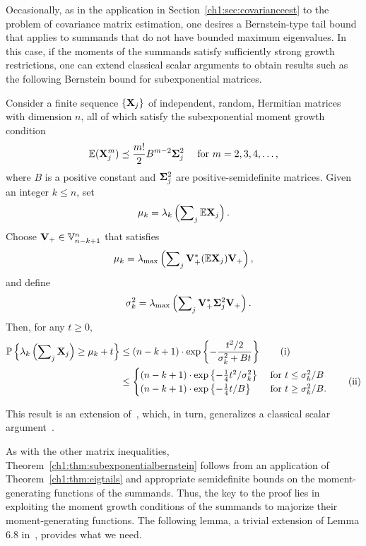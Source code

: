 Occasionally, as in the application in Section~\ref{ch1:sec:covarianceest} to the
problem of covariance matrix estimation, one desires a Bernstein-type tail bound
that applies to summands that do not have bounded maximum eigenvalues. In this
case, if the moments of the summands satisfy sufficiently strong growth
restrictions, one can extend classical scalar arguments to obtain results such
as the following Bernstein bound for subexponential matrices. 

\begin{thm}
Consider a finite sequence $\{\mathbf{X}_j\}$ of independent, random, Hermitian
matrices with dimension $n$, all of which satisfy the subexponential moment
growth condition
\[
\mathbb{E} (\mathbf{X}_j^m) \preceq \frac{m!}{2} B^{m-2} \mathbf{\Sigma}_j^2 \quad \text{ for
} m=2,3,4,\ldots,
\]
where $B$ is a positive constant and $\mathbf{\Sigma}_j^2$ are
positive-semidefinite matrices. Given an integer $k \leq n$, set
\[
\mu_k = \lambda_k \left( \sum\nolimits_j \mathbb{E} \mathbf{X}_j \right).
\]
Choose $\mathbf{V}_+ \in \mathbb{V}_{n-k+1}^{n}$ that satisfies
\[
\mu_k = \lambda_{\mathrm{max}}\left( \sum\nolimits_j \mathbf{V}_+^* (\mathbb{E} \mathbf{X}_j) \mathbf{V}_+ \right),
\]
and define
\[
 \quad \sigma_k^2 = \lambda_{\mathrm{max}}\left( \sum\nolimits_j \mathbf{V}_+^* \mathbf{\Sigma}_j^2
\mathbf{V}_+ \right).
\] 
Then, for any $t \geq 0,$
\begin{align}
\mathbb{P}\left\{\lambda_k \left( \sum\nolimits_j \mathbf{X}_j \right) \geq \mu_k + t \right\} & \leq
(n-k+1) \cdot \mathrm{exp}\left\{ - \frac{t^2/2}{\sigma_k^2 + B t}\right\} \tag{i}
\label{ch1:eqn:subexponentialbernstein} \\
 & \leq \begin{cases}
         (n-k+1) \cdot \mathrm{exp}\left\{ -\tfrac{1}{4} t^2/\sigma_k^2\right\} & \text{
for } t \leq \sigma_k^2/B \\
	 (n-k+1) \cdot \mathrm{exp}\left\{ -\tfrac{1}{4} t/B\right\} & \text{ for } t
\geq \sigma_k^2/B.
        \end{cases} \tag{ii} \label{ch1:eqn:splitsubexponentialbernstein}
\end{align}
\label{ch1:thm:subexponentialbernstein}
\end{thm}
 
This result is an extension of~\cite[Theorem 6.2]{T10a}, which, in turn,
generalizes a classical scalar argument~\cite{DG99}.

As with the other matrix inequalities, Theorem~\ref{ch1:thm:subexponentialbernstein}
follows from an application of Theorem~\ref{ch1:thm:eigtails} and appropriate
semidefinite bounds on the moment-generating functions of the summands. Thus,
the key to the proof lies in exploiting the moment growth conditions of the
summands to majorize their moment-generating functions. The following lemma, a
trivial extension of Lemma 6.8 in~\cite{T10a}, provides what we need.

